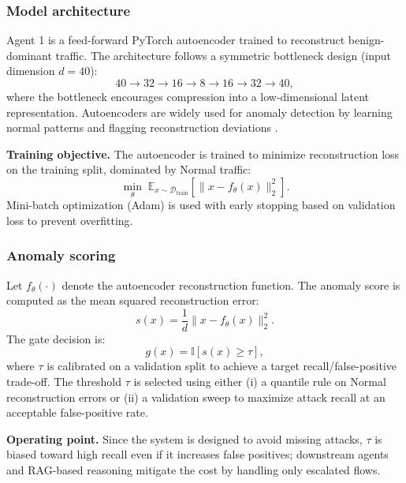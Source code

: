 \documentclass[conference]{IEEEtran}
\begin{document}
\subsubsection{Model architecture}
Agent 1 is a feed-forward PyTorch autoencoder trained to reconstruct benign-dominant traffic. The architecture follows a symmetric bottleneck design (input dimension $d=40$):
\begin{equation}
40 \rightarrow 32 \rightarrow 16 \rightarrow 8 \rightarrow 16 \rightarrow 32 \rightarrow 40,
\end{equation}
where the bottleneck encourages compression into a low-dimensional latent representation. Autoencoders are widely used for anomaly detection by learning normal patterns and flagging reconstruction deviations \cite{Hinton2006Reducing,Mirsky2018Kitsune}.

\textbf{Training objective.} The autoencoder is trained to minimize reconstruction loss on the training split, dominated by Normal traffic:
\begin{equation}
 \min_\theta\; \mathbb{E}_{x\sim\mathcal{D}_{\text{train}}}\left[\lVert x - f_\theta(x)\rVert_2^2\right].
\end{equation}
Mini-batch optimization (Adam) is used with early stopping based on validation loss to prevent overfitting.

\subsubsection{Anomaly scoring}
Let $f_\theta(\cdot)$ denote the autoencoder reconstruction function. The anomaly score is computed as the mean squared reconstruction error:
\begin{equation}
 s(x) = \frac{1}{d}\lVert x - f_\theta(x) \rVert_2^2.
\end{equation}
The gate decision is:
\begin{equation}
 g(x) = \mathbb{I}[s(x) \ge \tau],
\end{equation}
where $\tau$ is calibrated on a validation split to achieve a target recall/false-positive trade-off. The threshold $\tau$ is selected using either (i) a quantile rule on Normal reconstruction errors or (ii) a validation sweep to maximize attack recall at an acceptable false-positive rate.

\textbf{Operating point.} Since the system is designed to avoid missing attacks, $\tau$ is biased toward high recall even if it increases false positives; downstream agents and RAG-based reasoning mitigate the cost by handling only escalated flows.
\end{document}
